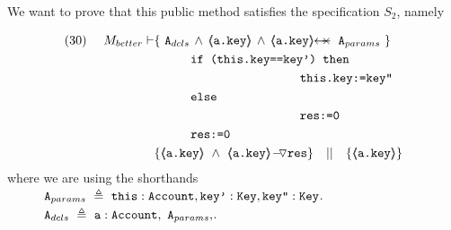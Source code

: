 We want to prove that this public method satisfies the specification  $S_2$, namely

\begin{lemma}
\label{l:satisfies:Mbetter:pec2}
 
\begin{align*}
\text{(30)}  \ \ \ \ M_{better} \vdash 
		&	\{  \ \Alocals\,\wedge\, {\inside{\prg{a.key}}} \, \wedge \, \protectedFrom {\prg{a.key}} {\Aparams}  \  \} \\
		& \SPT   \prg{if (this.key==key') then }\\
		& \SPT \SPT   \SPT\SPT  \prg{this.key:=key''} \\
	        & \SPT   \prg{else }\\
		& \SPT\SPT   \SPT\SPT  \prg{res:=0} \\
		& \SPT \prg{res:=0} \\
		& \{ {\inside{\prg{a.key}}}\ \wedge\ {\PushASLong {\prg{res}} {\inside{\prg{a.key}}}}  \} \ \ \  || \ \ \ 
		   \{ {\inside{\prg{a.key}}} \}
\end{align*}
where we are using the shorthands\\
 $ ~ \strut \hspace{.9cm}  \mbox{\normalfont{\texttt{A}}}_{params}\ \triangleq \  \mbox{\normalfont{\texttt{this}}}:\mbox{\normalfont{\texttt{Account}}}, \mbox{\normalfont{\texttt{key'}}} : \mbox{\normalfont{\texttt{Key}}}, \mbox{\normalfont{\texttt{key''}}} : \mbox{\normalfont{\texttt{Key}}}$.\\
   $ ~ \strut \hspace{.9cm}  \mbox{\normalfont{\texttt{A}}}_{dcls}\ \triangleq \    \mbox{\normalfont{\texttt{a}}}:\mbox{\normalfont{\texttt{Account}}}, \ \mbox{\normalfont{\texttt{A}}}_{params}, $.\\

\end{lemma}

